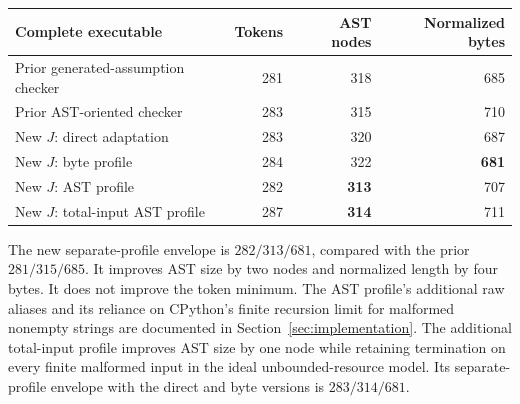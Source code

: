 \begin{center}
\begin{tabular}{lrrr}
\toprule
Complete executable & Tokens & AST nodes & Normalized bytes\\
\midrule
Prior generated-assumption checker & 281 & 318 & 685\\
Prior AST-oriented checker & 283 & 315 & 710\\
New $J$: direct adaptation & 283 & 320 & 687\\
New $J$: byte profile & 284 & 322 & \textbf{681}\\
New $J$: AST profile & 282 & \textbf{313} & 707\\
New $J$: total-input AST profile & 287 & \textbf{314} & 711\\
\bottomrule
\end{tabular}
\end{center}
The new separate-profile envelope is $282/313/681$, compared with the
prior $281/315/685$. It improves AST size by two nodes and normalized
length by four bytes. It does not improve the token minimum. The AST
profile's additional raw aliases and its reliance on CPython's finite
recursion limit for malformed nonempty strings are documented in
Section~\ref{sec:implementation}.
The additional total-input profile improves AST size by one node while
retaining termination on every finite malformed input in the ideal
unbounded-resource model. Its separate-profile envelope with the direct
and byte versions is $283/314/681$.
